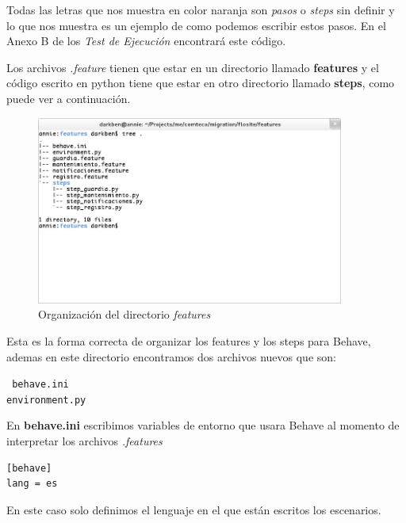 Todas las letras que nos muestra en color naranja son \emph{pasos} o \emph{steps}
sin definir y lo que nos muestra es un ejemplo de como podemos escribir estos
pasos. En el Anexo B de los \emph{Test de Ejecución} encontrará este código.

Los archivos \emph{.feature} tienen que estar en un directorio llamado {\bfseries
features} y el código escrito en python tiene que estar en otro directorio
llamado {\bfseries steps}, como puede ver a continuación.

\begin{figure}[h]
  \begin{center}
  \includegraphics[width=0.9\textwidth]{figures/chapter4/features_dir.png}
  \caption[Directorio features]{Organización del directorio \emph{features}}
\end{center}
\end{figure}

Esta es la forma correcta de organizar los features y los steps para Behave,
ademas en este directorio encontramos dos archivos nuevos que son:

\vspace{0.5cm}
\begin{mdframed}
\noindent
\texttt{
behave.ini \\
environment.py
}
\end{mdframed}
\vspace{0.5cm}

En {\bfseries behave.ini} escribimos variables de entorno que usara Behave al
momento de interpretar los archivos {\it .features}

\begin{verbatim}
[behave]
lang = es
\end{verbatim}

En este caso solo definimos el lenguaje en el que están escritos los escenarios.


